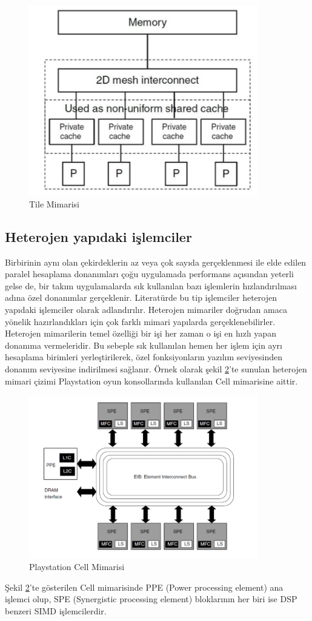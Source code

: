 \begin{figure}[h] \label{image:tileArchitecture} 
\centering \includegraphics[width=10cm]{gorsel/tileArchitecture.png} \caption{Tile Mimarisi}  
\end{figure}

\subsection{Heterojen yapıdaki işlemciler}
Birbirinin aynı olan çekirdeklerin az veya çok sayıda gerçeklenmesi ile elde edilen paralel hesaplama donanımları çoğu uygulamada performans açısından yeterli gelse de, bir takım uygulamalarda sık kullanılan bazı işlemlerin hızlandırılması adına özel donanımlar gerçeklenir. Literatürde bu tip işlemciler heterojen yapıdaki işlemciler olarak adlandırılır. Heterojen mimariler doğrudan amaca yönelik hazırlandıkları için çok farklı mimari yapılarda gerçeklenebilirler. Heterojen mimarilerin temel özelliği bir işi her zaman o işi en hızlı yapan donanıma vermeleridir. Bu sebeple sık kullanılan hemen her işlem için ayrı hesaplama birimleri yerleştirilerek, özel fonksiyonların yazılım seviyesinden donanım seviyesine indirilmesi sağlanır. Örnek olarak şekil \ref{image:playStationArchitecture}'te sunulan heterojen mimari çizimi Playstation oyun konsollarında kullanılan Cell mimarisine aittir. 

\begin{figure}[h] \label{image:playStationArchitecture} 
\centering \includegraphics[width=10cm]{gorsel/playStationArchitecture.png} \caption{Playstation Cell Mimarisi}  
\end{figure}

Şekil \ref{image:playStationArchitecture}'te gösterilen Cell mimarisinde PPE (Power processing element) ana işlemci olup, SPE (Synergistic processing element) bloklarının her biri ise DSP benzeri SIMD işlemcilerdir.